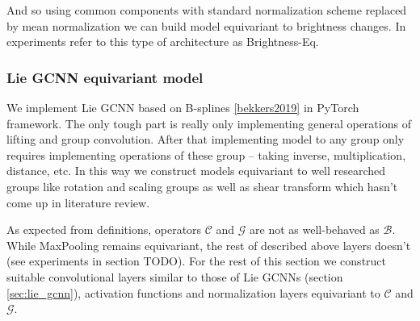 And so using common components with standard normalization scheme replaced by
mean normalization we can build model equivariant to brightness changes. In
experiments refer to this type of architecture as Brightness-Eq.

\subsubsection{Lie GCNN equivariant model}
We implement Lie GCNN based on B-splines \ref{bekkers2019} in PyTorch framework.
The only tough part is really only
implementing general operations of lifting and group convolution.
After that implementing model to any group only requires implementing operations
of these group -- taking inverse, multiplication, distance, etc.
In this way we construct models equivariant to well researched groups like
rotation and
scaling groups as well as shear transform which hasn't come up in literature
review.


As expected from definitions, operators $\mathcal{C}$ and $\mathcal{G}$ are not
as well-behaved as $\mathcal{B}$. While MaxPooling remains equivariant, the rest
of described above layers doesn't (see experiments in section TODO).
For the rest of this section we construct suitable
convolutional layers similar to those of Lie
GCNNs (section \ref{sec:lie_gcnn}),
activation functions and
normalization layers
equivariant to $\mathcal{C}$ and $\mathcal{G}$.

